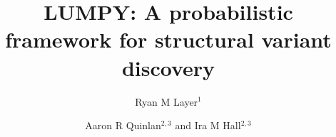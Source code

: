 \documentclass[10pt]{bmc_article}
\newenvironment{bmcformat}{\begin{raggedright}\baselineskip20pt\sloppy\setboolean{publ}{false}}{\end{raggedright}\baselineskip20pt\sloppy}
\begin{document}
\begin{bmcformat}

\title{LUMPY: A probabilistic framework for structural variant discovery}
\author{
Ryan M Layer$^1$\and
Aaron R Quinlan\correspondingauthor$^{2,3}$
and
Ira M Hall\correspondingauthor$^{2,3}$
}

\address{\iid(1)Department of Computer Science, University of Virginia,
Charlottesville, VA\\
\iid(2)Department of Biochemistry and Molecular Genetics,
University of Virginia, Charlottesville, VA\\
\iid(3)Department of Public Health Sciences and
Center for Public Health Genomics, University of Virginia, Charlottesville, VA
}



\end{bmcformat}
\end{document}
